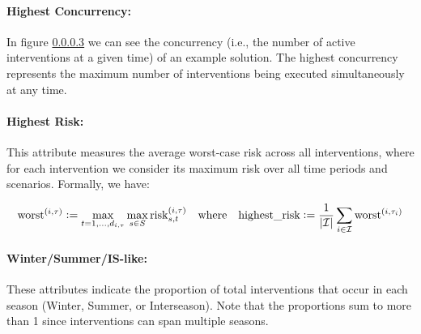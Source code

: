 \paragraph{Highest Concurrency:} In figure \ref{} we can see the concurrency (i.e., the number of active interventions at a given time) of an example solution. The highest concurrency represents the maximum number of interventions being executed simultaneously at any time. 




\paragraph{Highest Risk:} This attribute measures the average worst-case risk across all interventions, where for each intervention we consider its maximum risk over all time periods and scenarios. Formally, we have:

\[\operatorname{worst}^{(i,\tau)} \mathrel{\mathop:}= \max_{t=1,\dots,d_{i,\tau}} \max_{s\in S} \mathrm{risk}_{s,t}^{(i,\tau)} \quad \text{where} \quad \text{highest\_risk} \mathrel{\mathop:}= \frac{1}{|\mathcal{I}|}\sum_{i\in\mathcal{I}} \operatorname{worst}^{(i,\tau_i)}\]



\paragraph{Winter/Summer/IS-like:} These attributes indicate the proportion of total interventions that occur in each season (Winter, Summer, or Interseason). Note that the proportions sum to more than 1 since interventions can span multiple seasons.
